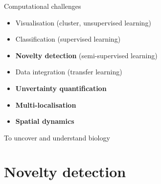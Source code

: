 \documentclass{beamer}
\theoremstyle{example}
\begin{document}
\begin{frame}{Computational challenges}

  \begin{itemize}
  \item Visualisation (cluster, unsupervised learning)
  \item Classification (supervised learning)
  \item \textbf{Novelty detection} (semi-supervised learning)
  \item Data integration (transfer learning)
  \item \textbf{Unvertainty quantification}
  \item \textbf{Multi-localisation}
  \item \textbf{Spatial dynamics}
  \end{itemize}
  \centering

  \bigskip

  {\Large To uncover and understand biology}
\end{frame}



\section{Novelty detection}
\end{document}
